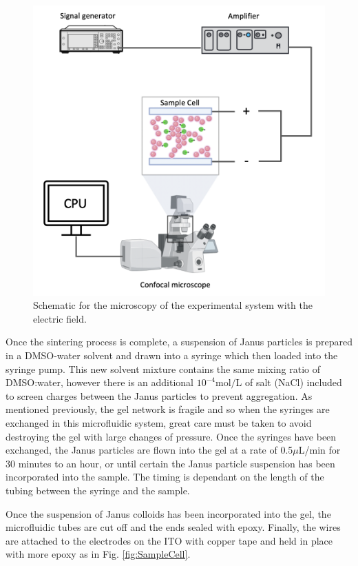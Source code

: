 \begin{figure}
	\centering
	\includegraphics[width=0.7\linewidth]{figsExpSystem/figCircuit.png}
	\caption[Schematic for microscopy of the experimental system]{Schematic for the microscopy of the experimental system with the electric field.}
	\label{fig:Circuit}
\end{figure}

Once the sintering process is complete, a suspension of  Janus particles is prepared in a DMSO-water solvent and drawn into a syringe which then loaded into the syringe pump. This new solvent mixture contains the same mixing ratio of DMSO:water, however there is an additional $10^{-4}\textrm{mol}/$L of salt (NaCl) included to screen charges between the Janus particles to prevent aggregation. As mentioned previously, the gel network is fragile and so when the syringes are exchanged in this microfluidic system, great care must be taken to avoid destroying the gel with large changes of pressure. Once the syringes have been exchanged, the Janus particles are flown into the gel at a rate of 0.5$\mu$L/min for 30 minutes to an hour, or until certain the Janus particle suspension has been incorporated into the sample. The timing is dependant on the length of the tubing between the syringe and the sample.

Once the suspension of Janus colloids has been incorporated into the gel, the microfluidic tubes are cut off and the ends sealed with epoxy. Finally, the wires are attached to the electrodes on the ITO with copper tape and held in place with more epoxy as in Fig. \ref{fig:SampleCell}. 


